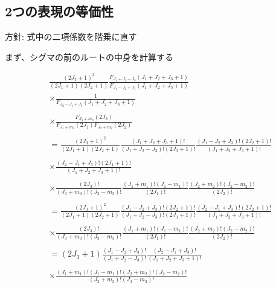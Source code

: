 \subsection{2つの表現の等価性}

方針: 式中の二項係数を階乗に直す



まず、シグマの前のルートの中身を計算する

\begin{align*}
    &\frac{(2J_3 + 1)^2}{(2J_1 + 1)(2J_2 + 1)}
    \frac{F_{J_1 + J_2 - J_3}(J_1 + J_2 + J_3 + 1)}{F_{J_1 - J_2 + J_3}(J_1 + J_2 + J_3 + 1)}\\ 
    &\times \frac{1}{ F_{J_2 - J_1 + J_3}(J_1 + J_2 + J_3 + 1)} \\
    \\
    &\times \frac{F_{J_3 + m_3}(2J_3)}{F_{J_1 + m_1}(2J_1) F_{J_2 + m_2}(2J_2)} \\
    \\
    &= \frac{(2J_3 + 1)^2}{(2J_1 + 1)(2J_2 + 1)} \frac{(J_1 + J_2 + J_3 + 1)!}{(J_1 + J_2 - J_3)!(2J_3 + 1)!} 
    \frac{(J_1 - J_2 + J_3)!(2J_2 + 1)!}{(J_1 + J_2 + J_3 + 1)!} \\
    \\
    &\times \frac{(J_2 - J_1 + J_3 )!(2J_1 + 1)!}{(J_1 + J_2 + J_3 + 1)!} \\
    \\
    &\times \frac{(2J_3)!}{(J_3 + m_3)!(J_3 - m_3)!} \frac{(J_1 + m_1)!(J_1 - m_1)!}{(2J_1)!} \frac{(J_2 + m_2)!(J_2 - m_2)!}{(2J_2)!} \\
    \\
    &= \frac{(2J_3 + 1)^2}{(2J_1 + 1)(2J_2 + 1)} \frac{(J_1 - J_2 + J_3)!(2J_2 + 1)!}{(J_1 + J_2 - J_3)!(2J_3 + 1)!} 
    \frac{(J_2 - J_1 + J_3)!(2J_2 + 1)!}{(J_1 + J_2 + J_3 + 1)!} \\
    \\ 
    &\times \frac{(2J_3)!}{(J_3 + m_3)!(J_3 - m_3)!} \frac{(J_1 + m_1)!(J_1 - m_1)!}{(2J_1)!} \frac{(J_2 + m_2)!(J_2 - m_2)!}{(2J_2)!} \\
    \\
    &= (2J_3 + 1)\frac{(J_1 - J_2 + J_3)!}{(J_1 + J_2 - J_3)!} 
    \frac{(J_2 - J_1 + J_3)!}{(J_1 + J_2 + J_3 + 1)!} \\
    \\ 
    &\times \frac{(J_1 + m_1)!(J_1 - m_1)!(J_2 + m_2)!(J_2 - m_2)!}{(J_3 + m_3)!(J_3 - m_3)!}  \\
\end{align*}


